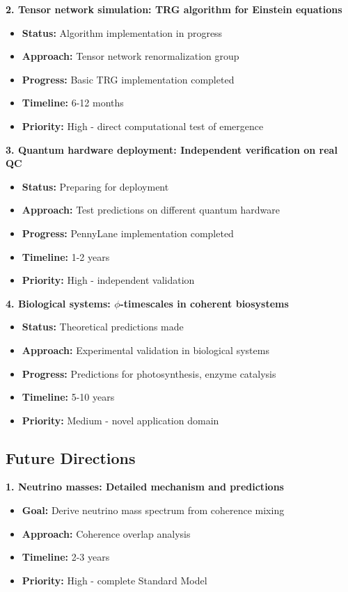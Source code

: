 \documentclass[11pt]{article}
\theoremstyle{definition}
\newcommand{\goldenratio}{\phi}
\begin{document}
\textbf{2. Tensor network simulation: TRG algorithm for Einstein equations}
\begin{itemize}
\item \textbf{Status:} Algorithm implementation in progress
\item \textbf{Approach:} Tensor network renormalization group
\item \textbf{Progress:} Basic TRG implementation completed
\item \textbf{Timeline:} 6-12 months
\item \textbf{Priority:} High - direct computational test of emergence
\end{itemize}

\textbf{3. Quantum hardware deployment: Independent verification on real QC}
\begin{itemize}
\item \textbf{Status:} Preparing for deployment
\item \textbf{Approach:} Test predictions on different quantum hardware
\item \textbf{Progress:} PennyLane implementation completed
\item \textbf{Timeline:} 1-2 years
\item \textbf{Priority:} High - independent validation
\end{itemize}

\textbf{4. Biological systems: $\goldenratio$-timescales in coherent biosystems}
\begin{itemize}
\item \textbf{Status:} Theoretical predictions made
\item \textbf{Approach:} Experimental validation in biological systems
\item \textbf{Progress:} Predictions for photosynthesis, enzyme catalysis
\item \textbf{Timeline:} 5-10 years
\item \textbf{Priority:} Medium - novel application domain
\end{itemize}

\subsection{Future Directions}

\textbf{1. Neutrino masses: Detailed mechanism and predictions}
\begin{itemize}
\item \textbf{Goal:} Derive neutrino mass spectrum from coherence mixing
\item \textbf{Approach:} Coherence overlap analysis
\item \textbf{Timeline:} 2-3 years
\item \textbf{Priority:} High - complete Standard Model
\end{itemize}
\end{document}
